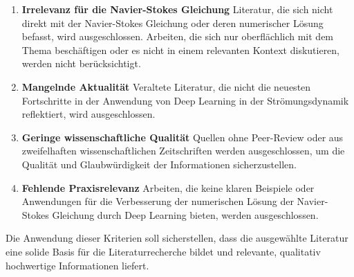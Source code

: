 \begin{enumerate}
  \item \textbf{Irrelevanz für die Navier-Stokes Gleichung} Literatur, die sich nicht direkt mit der Navier-Stokes Gleichung oder deren numerischer Lösung befasst, wird ausgeschlossen. Arbeiten, die sich nur oberflächlich mit dem Thema beschäftigen oder es nicht in einem relevanten Kontext diskutieren, werden nicht berücksichtigt.
  
  \item \textbf{Mangelnde Aktualität} Veraltete Literatur, die nicht die neuesten Fortschritte in der Anwendung von Deep Learning in der Strömungsdynamik reflektiert, wird ausgeschlossen.
  
  \item \textbf{Geringe wissenschaftliche Qualität} Quellen ohne Peer-Review oder aus zweifelhaften wissenschaftlichen Zeitschriften werden ausgeschlossen, um die Qualität und Glaubwürdigkeit der Informationen sicherzustellen.
  
  \item \textbf{Fehlende Praxisrelevanz} Arbeiten, die keine klaren Beispiele oder Anwendungen für die Verbesserung der numerischen Lösung der Navier-Stokes Gleichung durch Deep Learning bieten, werden ausgeschlossen.
\end{enumerate}

Die Anwendung dieser Kriterien soll sicherstellen, dass die ausgewählte Literatur eine solide Basis für die Literaturrecherche bildet und relevante, qualitativ hochwertige Informationen liefert.
